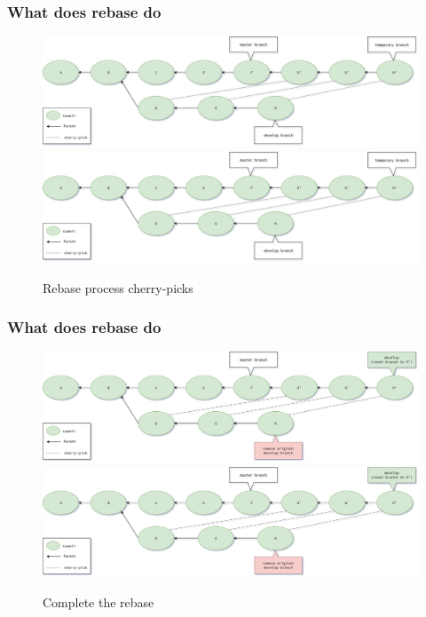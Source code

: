 \begin{frame}
    \frametitle{What does rebase do}
    \addtocounter{page}{-1}
    \begin{figure}
        \begin{center}
            {
                \includegraphics[width=1\textwidth,keepaspectratio]{./images/Rebase-Process.png}
            }
            {
                \includegraphics[width=1\textwidth,keepaspectratio]{./images/Rebase-Process.png}
            }
            \caption{Rebase process cherry-picks}
        \end{center}
    \end{figure}
\end{frame}

\begin{frame}
    \frametitle{What does rebase do}
    \addtocounter{page}{-1}
    \begin{figure}
        \begin{center}
            {
                \includegraphics[width=1\textwidth,keepaspectratio]{./images/Rebase-Completed.png}
            }
            {
                \includegraphics[width=1\textwidth,keepaspectratio]{./images/Rebase-Completed.png}
            }
            \caption{Complete the rebase}
        \end{center}
    \end{figure}
\end{frame}

